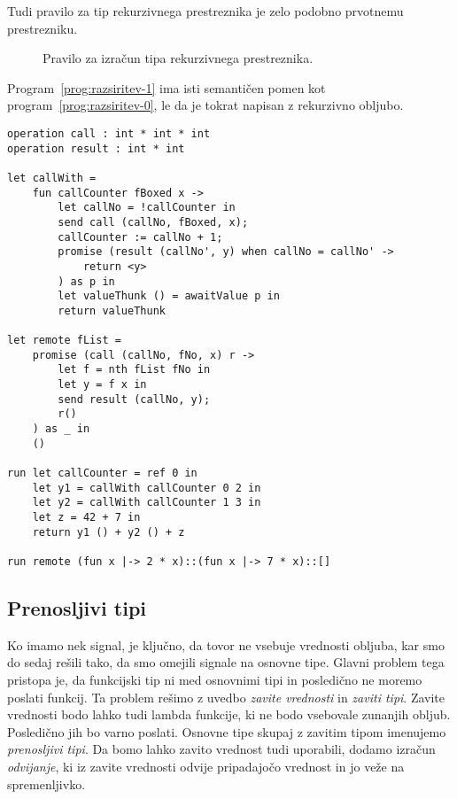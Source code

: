 Tudi pravilo za tip rekurzivnega prestreznika je zelo podobno prvotnemu prestrezniku.

\begin{figure}[h]
	\centering
	\small
	\begin{mathpar}
	\end{mathpar}
	
	\caption{Pravilo za izračun tipa rekurzivnega prestreznika.}
	\label{fig:tipi-pravila-rekurzivni-prestreznik}
\end{figure} 

Program~\ref{prog:razsiritev-1} ima isti semantičen pomen kot program~\ref{prog:razsiritev-0}, le da je tokrat napisan z rekurzivno obljubo.

\begin{lstlisting}[caption={Primer z rekurzivnim prestreznikom},label={prog:razsiritev-1},float,floatplacement=h]
operation call : int * int * int
operation result : int * int

let callWith =
	fun callCounter fBoxed x ->
		let callNo = !callCounter in
		send call (callNo, fBoxed, x);
		callCounter := callNo + 1;
		promise (result (callNo', y) when callNo = callNo' ->
			return <y>
		) as p in
		let valueThunk () = awaitValue p in
		return valueThunk

let remote fList =
	promise (call (callNo, fNo, x) r ->
		let f = nth fList fNo in
		let y = f x in
		send result (callNo, y);
		r()
	) as _ in
	()

run	let callCounter = ref 0 in
	let y1 = callWith callCounter 0 2 in
	let y2 = callWith callCounter 1 3 in
	let z = 42 + 7 in
	return y1 () + y2 () + z

run remote (fun x |-> 2 * x)::(fun x |-> 7 * x)::[]
\end{lstlisting}



\subsection{Prenosljivi tipi}

Ko imamo nek signal, je ključno, da tovor ne vsebuje vrednosti obljuba, kar smo do sedaj rešili tako, da smo omejili signale na osnovne tipe. Glavni problem tega pristopa je, da funkcijski tip ni med osnovnimi tipi in posledično ne moremo poslati funkcij. Ta problem rešimo z uvedbo \emph{zavite vrednosti} in \emph{zaviti tipi}. Zavite vrednosti bodo lahko tudi lambda funkcije, ki ne bodo vsebovale zunanjih obljub. Posledično jih bo varno poslati. Osnovne tipe skupaj z zavitim tipom imenujemo \emph{prenosljivi tipi}. Da bomo lahko zavito vrednost tudi uporabili, dodamo izračun \emph{odvijanje}, ki iz zavite vrednosti odvije pripadajočo vrednost in jo veže na spremenljivko.

